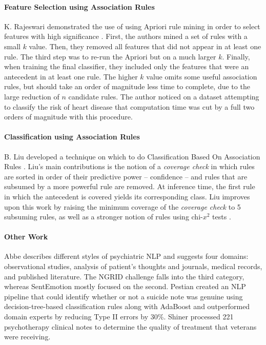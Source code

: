 \paragraph{Feature Selection using Association Rules} K. Rajeswari demonstrated the use of using \textsf{Apriori} rule mining in order to select features with high significance \cite{rajeswari}. First, the authors mined a set of rules with a small $k$ value. Then, they removed all features that did not appear in at least one rule. The third step was to re-run the \textsf{Apriori} but on a much larger $k$. Finally, when training the final classifier, they included only the features that were an antecedent in at least one rule. The higher $k$ value omits some useful association rules, but should take an order of magnitude less time to complete, due to the large reduction of $n$ candidate rules. The author noticed on a dataset attempting to classify the risk of heart disease that computation time was cut by a full two orders of magnitude with this procedure.

\paragraph{Classification using Association Rules} B. Liu developed a technique on which to do Classification Based On Association Rules \cite{cba}. Liu's main contributions is the notion of a \textit{coverage check} in which rules are sorted in order of their predictive power -- confidence -- and rules that are subsumed by a more powerful rule are removed. At inference time, the first rule in which the antecedent is covered yields its corresponding class. Liu improves upon this work by raising the minimum coverage of the \textit{coverage check} to 5 subsuming rules, as well as a stronger notion of rules using chi-$x^2$ tests \cite{cmar}. 

\paragraph{Other Work} Abbe \cite{abbe} describes different styles of psychiatric NLP and suggests four domains: observational studies, analysis of patient's thoughts and journals, medical records, and published literature. The NGRID challenge falls into the third category, whereas SentEmotion mostly focused on the second. Pestian \cite{pestian} created an NLP pipeline that could identify whether or not a suicide note was genuine using decision-tree-based classification rules along with AdaBoost and outperformed domain experts by reducing Type II errors by 30\%. Shiner \cite{shiner} processed 221 psychotherapy clinical notes to determine the quality of treatment that veterans were receiving. 

